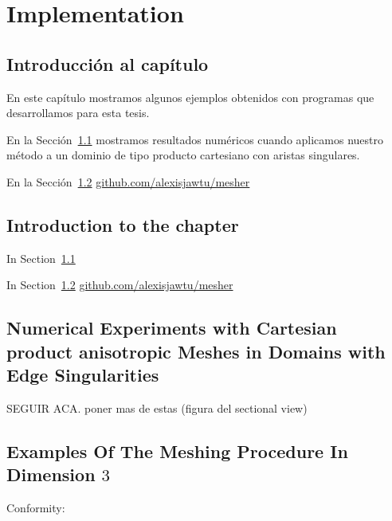 \chapter{Implementation}

\section*{Introducci\'on al cap\'itulo}
En este cap\'itulo mostramos algunos ejemplos obtenidos 
con programas que desarrollamos para esta tesis.

En la Sección~\ref{auxlabel210} mostramos resultados num\'ericos
cuando aplicamos nuestro m\'etodo a un dominio de tipo producto cartesiano
con aristas singulares.












En la Sección~\ref{auxlabel211}
\href{https://github.com/alexisjawtu/mesher}{github.com/alexisjawtu/mesher}




\section*{Introduction to the chapter}

In Section~\ref{auxlabel210}












In Section~\ref{auxlabel211}
\href{https://github.com/alexisjawtu/mesher}{github.com/alexisjawtu/mesher}


\section{Numerical Experiments with Cartesian product anisotropic Meshes in Domains with Edge Singularities}
\label{auxlabel210}
\edgedomain
SEGUIR ACA. poner mas de estas (figura del sectional view)
\unifSection
\tableErrorsUniformCylinder
\tableErrorsAnisoCylinder
\section{Examples Of The Meshing Procedure In Dimension $3$} %
\label{auxlabel211}
\label{sec:examples_of_the_meshing_procedure}
\tauZero
\newpage
{}
\newpage
\tauOneEnCube
\tauOneEn
\newpage
Conformity:
\conform